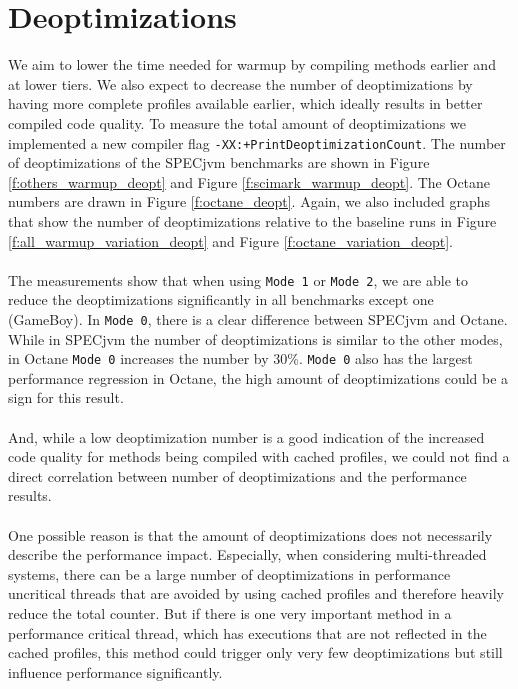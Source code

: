 \section{Deoptimizations}
\label{s:perf_deoptimizations}
We aim to lower the time needed for warmup by compiling methods earlier and at lower tiers. We also expect to decrease the number of deoptimizations by having more complete profiles available earlier, which ideally results in better compiled code quality. To measure the total amount of deoptimizations we implemented a new compiler flag \texttt{-XX:+PrintDeoptimizationCount}.
The number of deoptimizations of the SPECjvm benchmarks are shown in Figure \ref{f:others_warmup_deopt} and Figure \ref{f:scimark_warmup_deopt}. The Octane numbers are drawn in Figure \ref{f:octane_deopt}.
Again, we also included graphs that show the number of deoptimizations relative to the baseline runs in Figure \ref{f:all_warmup_variation_deopt} and Figure \ref{f:octane_variation_deopt}.
\\\\
The measurements show that when using \texttt{Mode 1} or \texttt{Mode 2}, we are able to reduce the deoptimizations significantly in all benchmarks except one (GameBoy). In \texttt{Mode 0}, there is a clear difference between SPECjvm and Octane. While in SPECjvm the number of deoptimizations is similar to the other modes, in Octane \texttt{Mode 0} increases the number by 30\%. \texttt{Mode 0} also has the largest performance regression in Octane, the high amount of deoptimizations could be a sign for this result. 
\\\\
And, while a low deoptimization number is a good indication of the increased code quality for methods being compiled with cached profiles, we could not find a direct correlation between number of deoptimizations and the performance results.
\\\\
One possible reason is that the amount of deoptimizations does not necessarily describe the performance impact. Especially, when considering multi-threaded systems, there can be a large number of deoptimizations in performance uncritical threads that are avoided by using cached profiles and therefore heavily reduce the total counter. But if there is one very important method in a performance critical thread, which has executions that are not reflected in the cached profiles, this method could trigger only very few deoptimizations but still influence performance significantly.
